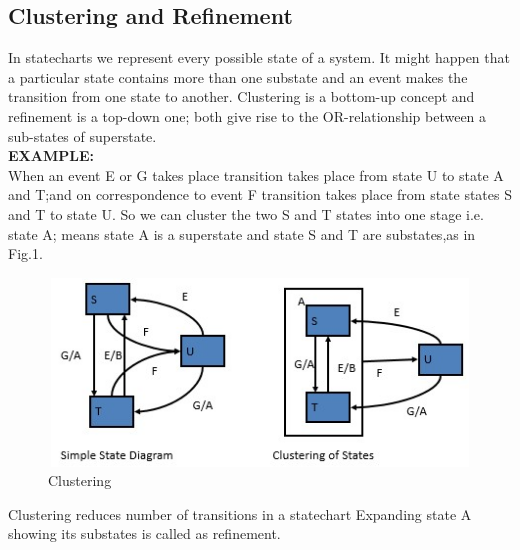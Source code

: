\documentclass[a4paper,12pt,oneside]{article}
\begin{document}
\subsection{Clustering and Refinement}
In statecharts we represent every possible state of a system. It might happen that a particular state contains more than one substate and an event makes the transition from one state to another. Clustering is a bottom-up concept and refinement is a top-down one; both give rise to the OR-relationship between a sub-states of superstate.\\

\noindent
\textbf{EXAMPLE:}\\
When an event E or G takes place transition takes place from state U to state A and T;and on correspondence to event F transition takes place from state states S and T to state U. So we can cluster the two S and T states into one stage i.e. state A; means state A is a superstate and state S and T are substates,as in Fig.1.
\begin{figure}[H]
\centering
\includegraphics[width=12cm,height=5cm]{Screenshot.jpg}
\caption{Clustering}
\end{figure}
Clustering reduces number of transitions in a statechart Expanding state A showing its substates is called as refinement.\\
\end{document}
